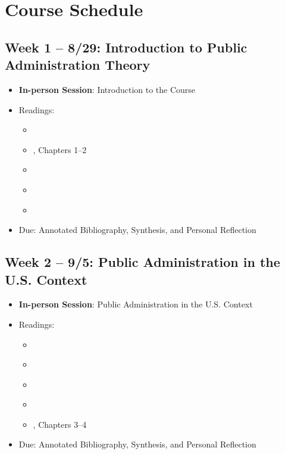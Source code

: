 \documentclass[12pt, letterpaper]{article}
\begin{document}
\section{Course Schedule}

\subsection*{Week 1 -- 8/29: Introduction to Public Administration Theory}
\begin{itemize}
    \item \textbf{In-person Session}: Introduction to the Course
    \item Readings:
        \begin{itemize}
            \item \cite{Weber1946}
            \item \cite{Denhardt2015}, Chapters 1--2
            \item \cite{Rosenbloom2008}
            \item \cite{Wilson1887}
            \item \cite{Wilson1989}
        \end{itemize}
    \item Due: Annotated Bibliography, Synthesis, and Personal Reflection
\end{itemize}

\subsection*{Week 2 -- 9/5: Public Administration in the U.S. Context}
\begin{itemize}
    \item \textbf{In-person Session}: Public Administration in the U.S. Context
    \item Readings:
    \begin{itemize}
        \item \cite{Allison1990}
        \item \cite{Kaufman1969}
        \item \cite{Kettl2020a}
        \item \cite{Overeem2005}
        \item \cite{Denhardt2015}, Chapters 3--4
    \end{itemize}
    \item Due: Annotated Bibliography, Synthesis, and Personal Reflection
\end{itemize}
\end{document}

